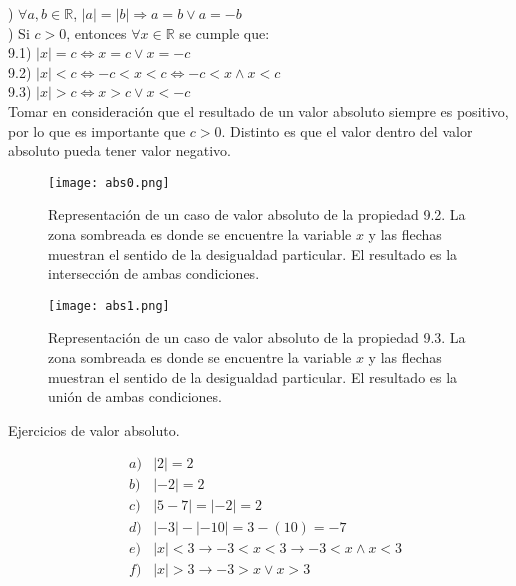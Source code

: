 ) $\forall a,b\in\mathbb{R}$, $|a|=|b|\Rightarrow a=b \vee a= -b$ \\

) Si $c>0$, entonces $\forall x\in\mathbb{R}$ se cumple que:\\

9.1) $|x|=c\Leftrightarrow x=c \vee x=-c$ \\

9.2) $|x|<c\Leftrightarrow -c<x<c \Leftrightarrow -c<x\wedge x<c$\\

9.3) $|x|>c\Leftrightarrow x>c \vee x<-c$\\

Tomar en consideración que el resultado de un valor absoluto siempre es positivo, por lo que es importante que $c>0$. Distinto es que el valor dentro del valor absoluto pueda tener valor negativo.
\begin{center}
	\begin{figure}[h!]
		\centering
		\texttt{[image: abs0.png]}
		\caption[Representación de un caso de valor absoluto de la propiedad 9.2]{Representación de un caso de valor absoluto de la propiedad 9.2. La zona sombreada es donde se encuentre la variable $x$ y las flechas muestran el sentido de la desigualdad particular. El resultado es la intersección de ambas condiciones.}
	\end{figure}
\end{center}
\begin{center}
	\begin{figure}[h!]
		\centering
		\texttt{[image: abs1.png]}
		\caption[Representación de un caso de valor absoluto de la propiedad 9.3]{Representación de un caso de valor absoluto de la propiedad 9.3. La zona sombreada es donde se encuentre la variable $x$ y las flechas muestran el sentido de la desigualdad particular. El resultado es la unión de ambas condiciones.}
	\end{figure}
\end{center}
\newpage
\begin{myexample}
Ejercicios de valor absoluto.
\end{myexample}
\begin{eqnarray*}
&a)& |2|=2\\
&b)&|-2|=2\\
&c)&|5-7|=|-2|=2\\
&d)&|-3|-|-10|=3-(10)=-7\\
&e)& |x|<3 \longrightarrow -3<x<3\longrightarrow -3<x \wedge x<3\\
&f)& |x|>3 \longrightarrow -3>x\vee x>3\\
\end{eqnarray*}

